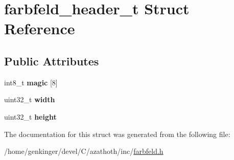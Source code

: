 \hypertarget{structfarbfeld__header__t}{}\section{farbfeld\+\_\+header\+\_\+t Struct Reference}
\label{structfarbfeld__header__t}
\subsection*{Public Attributes}
\begin{DoxyCompactItemize}
\item 
\mbox{\label{structfarbfeld__header__t_a018fd4f1bb40613738d2563ab9a27b4a}} 
int8\+\_\+t {\bfseries magic} \mbox{[}8\mbox{]}
\item 
\mbox{\label{structfarbfeld__header__t_a285e1dd203b567d6459e7d2fbcedca44}} 
uint32\+\_\+t {\bfseries width}
\item 
\mbox{\label{structfarbfeld__header__t_ab90e2799d4d3d943d3c7ddb8dca12534}} 
uint32\+\_\+t {\bfseries height}
\end{DoxyCompactItemize}


The documentation for this struct was generated from the following file\+:\begin{DoxyCompactItemize}
\item 
/home/genkinger/devel/\+C/azathoth/inc/\mbox{\hyperlink{farbfeld_8h}{farbfeld.\+h}}\end{DoxyCompactItemize}
